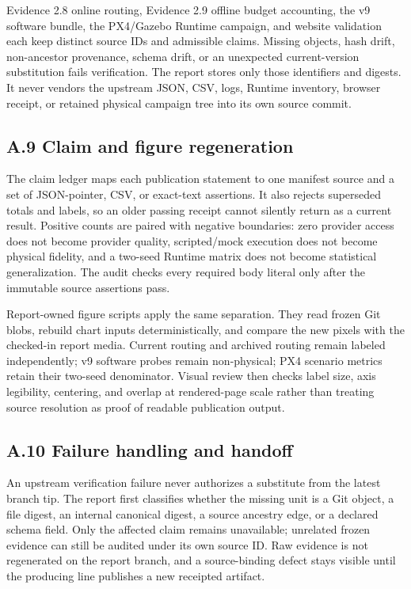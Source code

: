 Evidence 2.8 online routing, Evidence 2.9 offline budget accounting, the
v9 software bundle, the PX4/Gazebo Runtime campaign, and website
validation each keep distinct source IDs and admissible claims. Missing
objects, hash drift, non-ancestor provenance, schema drift, or an
unexpected current-version substitution fails verification. The report
stores only those identifiers and digests. It never vendors the upstream
JSON, CSV, logs, Runtime inventory, browser receipt, or retained physical
campaign tree into its own source commit.

\subsection{\texorpdfstring{\textbf{A.9 Claim and figure
regeneration}}{A.9 Claim and figure regeneration}}\label{a.9-claim-and-figure-regeneration}

The claim ledger maps each publication statement to one manifest source
and a set of JSON-pointer, CSV, or exact-text assertions. It also rejects
superseded totals and labels, so an older passing receipt cannot silently
return as a current result. Positive counts are paired with negative
boundaries: zero provider access does not become provider quality,
scripted/mock execution does not become physical fidelity, and a
two-seed Runtime matrix does not become statistical generalization. The
audit checks every required body literal only after the immutable source
assertions pass.

Report-owned figure scripts apply the same separation. They read frozen
Git blobs, rebuild chart inputs deterministically, and compare the new
pixels with the checked-in report media. Current routing and archived
routing remain labeled independently; v9 software probes remain
non-physical; PX4 scenario metrics retain their two-seed denominator.
Visual review then checks label size, axis legibility, centering, and
overlap at rendered-page scale rather than treating source resolution as
proof of readable publication output.

\subsection{\texorpdfstring{\textbf{A.10 Failure handling and
handoff}}{A.10 Failure handling and handoff}}\label{a.10-failure-handling-and-handoff}

An upstream verification failure never authorizes a substitute from the
latest branch tip. The report first classifies whether the missing unit is
a Git object, a file digest, an internal canonical digest, a source
ancestry edge, or a declared schema field. Only the affected claim remains
unavailable; unrelated frozen evidence can still be audited under its own
source ID. Raw evidence is not regenerated on the report branch, and a
source-binding defect stays visible until the producing line publishes a
new receipted artifact.

